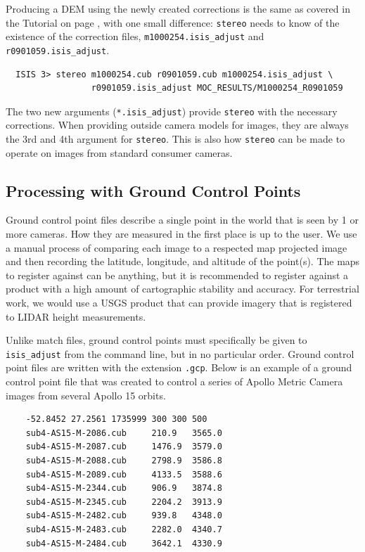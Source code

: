 Producing a DEM using the newly created corrections is the same as
covered in the Tutorial on page \pageref{ch:tutorial}, with one small
difference: \texttt{stereo} needs to know of the existence of the
correction files, \texttt{m1000254.isis\_adjust} and
\texttt{r0901059.isis\_adjust}.

\begin{verbatim}
  ISIS 3> stereo m1000254.cub r0901059.cub m1000254.isis_adjust \
                 r0901059.isis_adjust MOC_RESULTS/M1000254_R0901059
\end{verbatim}

The two new arguments (\texttt{*.isis\_adjust}) provide
\texttt{stereo} with the necessary corrections. When providing outside
camera models for images, they are always the 3rd and 4th argument for
\texttt{stereo}. This is also how \texttt{stereo} can be made to
operate on images from standard consumer cameras.

\subsection{Processing with Ground Control Points}

Ground control point files describe a single point in the world
that is seen by 1 or more cameras. How they are measured in the
first place is up to the user. We use a manual process of comparing
each image to a respected map projected image and then recording
the latitude, longitude, and altitude of the point(s). The maps to
register against can be anything, but it is recommended to register
against a product with a high amount of cartographic stability and
accuracy.  For terrestrial work, we would use a \ac{USGS} product
that can provide imagery that is registered to LIDAR height
measurements.

Unlike match files, ground control points must specifically be given
to \texttt{isis\_adjust} from the command line, but in no particular
order. Ground control point files are written with the extension
\texttt{.gcp}. Below is an example of a ground control point file that
was created to control a series of Apollo Metric Camera images from
several Apollo 15 orbits.

\begin{verbatim}
    -52.8452 27.2561 1735999 300 300 500
    sub4-AS15-M-2086.cub     210.9   3565.0
    sub4-AS15-M-2087.cub     1476.9  3579.0
    sub4-AS15-M-2088.cub     2798.9  3586.8
    sub4-AS15-M-2089.cub     4133.5  3588.6
    sub4-AS15-M-2344.cub     906.9   3874.8
    sub4-AS15-M-2345.cub     2204.2  3913.9
    sub4-AS15-M-2482.cub     939.8   4348.0
    sub4-AS15-M-2483.cub     2282.0  4340.7
    sub4-AS15-M-2484.cub     3642.1  4330.9
\end{verbatim}

